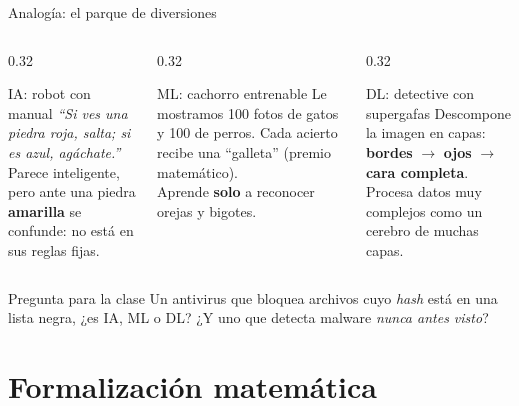 \documentclass[10pt,aspectratio=169]{beamer}
\begin{document}
\begin{frame}{Analogía: el parque de diversiones}
  \begin{columns}[T]
    \begin{column}{0.32\textwidth}
      \begin{block}{IA: robot con manual}
        \small
        \emph{``Si ves una piedra roja, salta; si es azul, agáchate.''}\\[0.4em]
        Parece inteligente, pero ante una piedra \textbf{amarilla} se confunde: no está en sus reglas fijas.
      \end{block}
    \end{column}
    \begin{column}{0.32\textwidth}
      \begin{block}{ML: cachorro entrenable}
        \small
        Le mostramos 100 fotos de gatos y 100 de perros. Cada acierto recibe una ``galleta'' (premio matemático).\\[0.4em]
        Aprende \textbf{solo} a reconocer orejas y bigotes.
      \end{block}
    \end{column}
    \begin{column}{0.32\textwidth}
      \begin{block}{DL: detective con supergafas}
        \small
        Descompone la imagen en capas: \textbf{bordes} $\to$ \textbf{ojos} $\to$ \textbf{cara completa}.\\[0.4em]
        Procesa datos muy complejos como un cerebro de muchas capas.
      \end{block}
    \end{column}
  \end{columns}
  \vfill
  \begin{alertblock}{Pregunta para la clase}
    Un antivirus que bloquea archivos cuyo \emph{hash} está en una lista negra, ¿es IA, ML o DL? ¿Y uno que detecta malware \emph{nunca antes visto}?
  \end{alertblock}
\end{frame}

\section{Formalización matemática}
\end{document}
